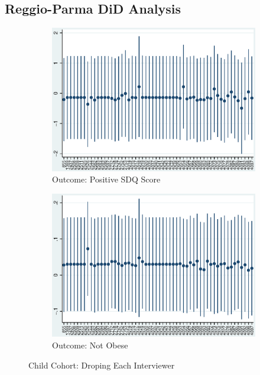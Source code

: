 \subsection{Reggio-Parma DiD Analysis} \label{sec:ParmaDiD-analysis}

    \begin{figure}[H]
      \centering
        \begin{subfigure}[t]{0.75\textwidth}
          \includegraphics[width=\textwidth]{../../../output/image/coef-interviewer-child-pos_childSDQ_score_PmDiD.eps}       
\caption{Outcome: Positive SDQ Score}        
        \end{subfigure}
        \begin{subfigure}[t]{0.75\textwidth}
          \includegraphics[width=\textwidth]{../../../output/image/coef-interviewer-child-BMI_obese_PmDiD.eps}       
 \caption{Outcome: Not Obese}        
        \end{subfigure}
      \caption{Child Cohort: Droping Each Interviewer}  \label{fig:child-sensitivity-interviewer_PmDiD}
    \end{figure}

